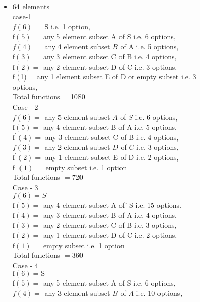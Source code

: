 \documentclass[10pt]{article}
\begin{document}
\begin{itemize}
  \item 64 elements\\
case-1\\
\(f(6)=\) S i.e. 1 option,\\
\(\mathrm{f}(5)=\) any 5 element subset A of S i.e. 6 options,\\
\(f(4)=\) any 4 element subset \(B\) of A i.e. 5 options,\\
\(\mathrm{f}(3)=\) any 3 element subset C of B i.e. 4 options,\\
\(\mathrm{f}(2)=\) any 2 element subset D of C i.e. 3 options,\\
f (1) = any 1 element subset E of D or empty subset i.e. 3\\
options,\\
Total functions = 1080\\
Case - 2\\
\(f(6)=\) any 5 element subset \(A\) of \(S\) i.e. 6 options,\\
\(\mathrm{f}(5)=\) any 4 element subset B of A i.e. 5 options,\\
\(\mathrm{f}^{\prime}(4)=\) any 3 element subset C of B i.e. 4 options,\\
\(f(3)=\) any 2 element subset \(D\) of \(C\) i.e. 3 options,\\
\(\mathrm{f}^{\prime}(2)=\) any 1 element subset E of D i.e. 2 options,\\
f \((1)=\) empty subset i.e. 1 option\\
Total functions \(=720\)\\
Case - 3\\
\(f(6)=S\)\\
\(\mathrm{f}(5)=\) any 4 element subset A of' S i.e. 15 options,\\
\(\mathrm{f}(4)=\) any 3 element subset B of A i.e. 4 options,\\
\(\mathrm{f}(3)=\) any 2 element subset C of B i.e. 3 options,\\
\(\mathrm{f}(2)=\) any 1 element subset D of C i.e. 2 options,\\
\(\mathrm{f}(1)=\) empty subset i.e. 1 option\\
Total functions \(=360\)\\
Case - 4\\
\(\mathrm{f}(6)=\mathrm{S}\)\\
\(\mathrm{f}(5)=\) any 5 element subset A of S i.e. 6 options,\\
\(f(4)=\) any 3 element subset \(B\) of \(A\) i.e. 10 options,\\

\end{itemize}
\end{document}
